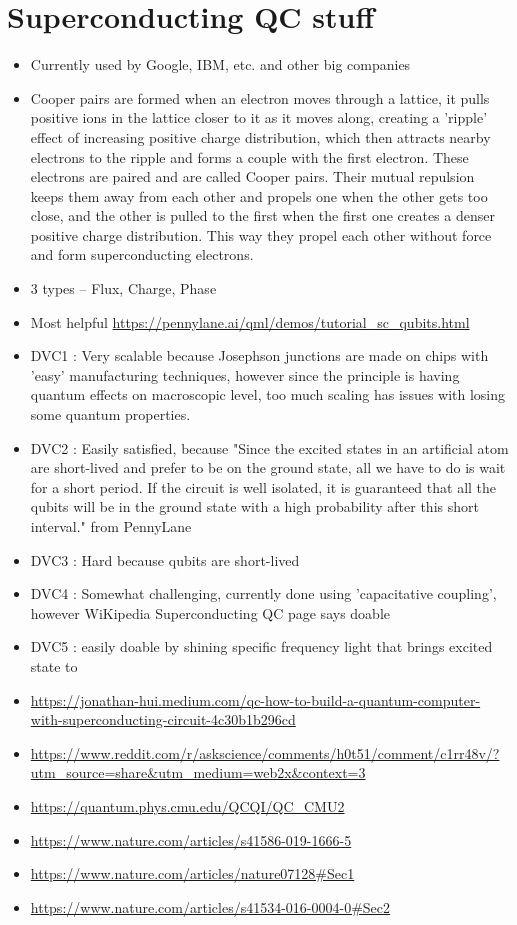 \section{Superconducting QC stuff}

\begin{itemize}
    \item Currently used by Google, IBM, etc. and other big companies
    \item Cooper pairs are formed when an electron moves through a lattice, it pulls positive ions in the lattice closer to it as it moves along, creating a 'ripple' effect of increasing positive charge distribution, which then attracts nearby electrons to the ripple and forms a couple with the first electron. These electrons are paired and are called Cooper pairs. Their mutual repulsion keeps them away from each other and propels one when the other gets too close, and the other is pulled to the first when the first one creates a denser positive charge distribution. This way they propel each other without force and form superconducting electrons. 
    \item 3 types – Flux, Charge, Phase
    \item Most helpful \url{https://pennylane.ai/qml/demos/tutorial_sc_qubits.html}
    \item DVC1 : Very scalable because Josephson junctions are made on chips with 'easy' manufacturing techniques, however since the principle is having quantum effects on macroscopic level, too much scaling has issues with losing some quantum properties.
    \item DVC2 : Easily satisfied, because "Since the excited states in an artificial atom are short-lived and prefer to be on the ground state, all we have to do is wait for a short period. If the circuit is well isolated, it is guaranteed that all the qubits will be in the ground state with a high probability after this short interval." from PennyLane
    \item DVC3 : Hard because qubits are short-lived
    \item DVC4 : Somewhat challenging, currently done using 'capacitative coupling', however WiKipedia Superconducting QC page says doable
    \item DVC5 : easily doable by shining specific frequency light that brings excited state to
    \item 
    \url{https://jonathan-hui.medium.com/qc-how-to-build-a-quantum-computer-with-superconducting-circuit-4c30b1b296cd}
    \item 
    \url{https://www.reddit.com/r/askscience/comments/h0t51/comment/c1rr48v/?utm_source=share&utm_medium=web2x&context=3}
    \item \url{https://quantum.phys.cmu.edu/QCQI/QC_CMU2}
    \item \url{https://www.nature.com/articles/s41586-019-1666-5}
    \item \url{https://www.nature.com/articles/nature07128#Sec1}
    \item \url{https://www.nature.com/articles/s41534-016-0004-0#Sec2}

\end{itemize}